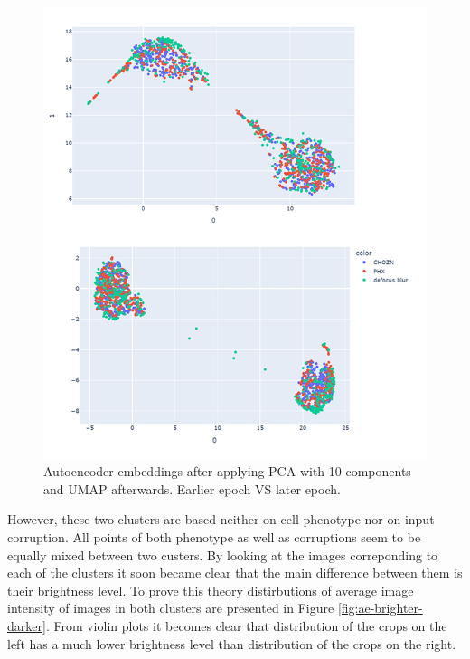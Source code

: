 \begin{figure}[htb]
	\begin{center}
		\includegraphics[width=0.8\linewidth]{bilder/ae-embeddings/pca-umap-clusters.png}
		\caption{Autoencoder embeddings after applying PCA with 10 components and UMAP afterwards. Earlier epoch VS later epoch.}\label{fig:ae-pca-umap-clustered}
	\end{center}
\end{figure}

However, these two clusters are based neither on cell phenotype nor on input corruption. All points of both phenotype as well as corruptions seem to be equally mixed between two custers. By looking at the images correponding to each of the clusters it soon became clear that the main difference between them is their brightness level. To prove this theory distirbutions of average image intensity of images in both clusters are presented in Figure \ref{fig:ae-brighter-darker}. From violin plots it becomes clear that distribution of the crops on the left has a much lower brightness level than distribution of the crops on the right.

